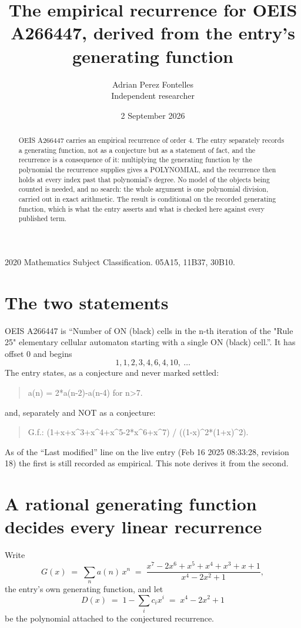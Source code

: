 \documentclass[11pt,a4paper]{article}
\title{The empirical recurrence for OEIS A266447, derived from the entry's generating function}
\author{Adrian Perez Fontelles\\ \small Independent researcher}
\date{2 September 2026}
\theoremstyle{plain}
\theoremstyle{definition}
\begin{document}
\maketitle

\begin{abstract}
OEIS A266447 carries an empirical recurrence of order $4$. The entry separately records a
generating function, not as a conjecture but as a statement of fact, and the recurrence is a
consequence of it: multiplying the generating function by the polynomial the recurrence
supplies gives a POLYNOMIAL, and the recurrence then holds at every index past that
polynomial's degree. No model of the objects being counted is needed, and no search: the
whole argument is one polynomial division, carried out in exact arithmetic. The result is
conditional on the recorded generating function, which is what the entry asserts and what is
checked here against every published term.
\end{abstract}

\noindent\small 2020 Mathematics Subject Classification. 05A15, 11B37, 30B10.\normalsize

\section{The two statements}

OEIS A266447 is ``Number of ON (black) cells in the n-th iteration of the "Rule 25" elementary cellular automaton starting with a single ON (black) cell.''. It has offset $0$ and begins
\[
1, 1, 2, 3, 4, 6, 4, 10,\ \dots
\]
The entry states, as a conjecture and never marked settled:
\begin{quote}
a(n) = 2*a(n-2)-a(n-4) for n>7.
\end{quote}
and, separately and NOT as a conjecture:
\begin{quote}
G.f.: (1+x+x\^{}3+x\^{}4+x\^{}5-2*x\^{}6+x\^{}7) / ((1-x)\^{}2*(1+x)\^{}2).
\end{quote}
As of the ``Last modified'' line on the live entry (Feb 16 2025 08:33:28, revision 18) the first is still
recorded as empirical. This note derives it from the second.

\section{A rational generating function decides every linear recurrence}

Write
\[
G(x)\;=\;\sum_{n}a(n)\,x^{n}\;=\;\frac{x^{7} - 2 x^{6} + x^{5} + x^{4} + x^{3} + x + 1}{x^{4} - 2 x^{2} + 1},
\]
the entry's own generating function, and let
\[
D(x)\;=\;1-\sum_i c_i x^{i}\;=\;x^{4} - 2 x^{2} + 1
\]
be the polynomial attached to the conjectured recurrence.
\end{document}
